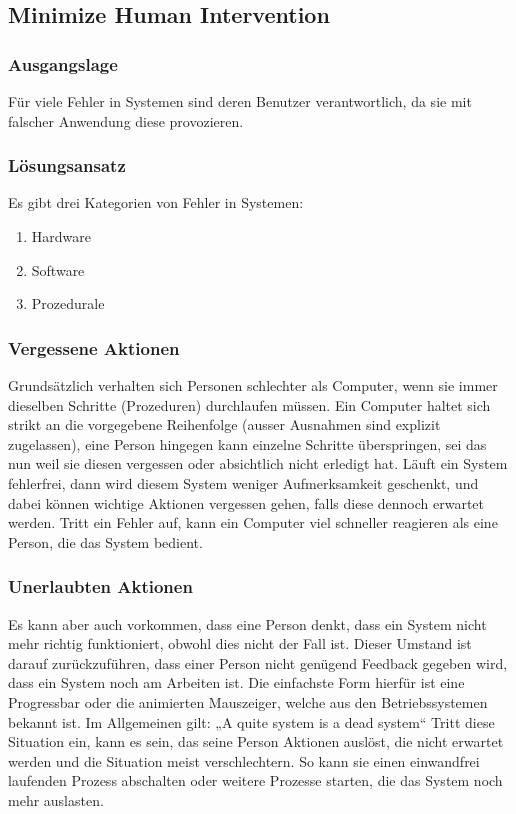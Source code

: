 
\subsection{Minimize Human Intervention}

\subsubsection*{Ausgangslage}

Für viele Fehler in Systemen sind deren Benutzer verantwortlich, da sie mit falscher Anwendung diese provozieren.
\subsubsection*{Lösungsansatz}

Es gibt drei Kategorien von Fehler in Systemen:
\begin{enumerate}
	\item Hardware
	\item Software
	\item Prozedurale
\end{enumerate}


\subsubsection*{Vergessene Aktionen}

Grundsätzlich verhalten sich Personen schlechter als Computer, wenn sie immer dieselben Schritte (Prozeduren) durchlaufen müssen. Ein Computer haltet sich strikt an die vorgegebene Reihenfolge (ausser Ausnahmen sind explizit zugelassen), eine Person hingegen kann einzelne Schritte überspringen, sei das nun weil sie diesen vergessen oder absichtlich nicht erledigt hat. Läuft ein System fehlerfrei, dann wird diesem System weniger Aufmerksamkeit geschenkt, und dabei können wichtige Aktionen vergessen gehen, falls diese dennoch erwartet werden.
Tritt ein Fehler auf, kann ein Computer viel schneller reagieren als eine Person, die das System bedient.

\subsubsection*{Unerlaubten Aktionen}

Es kann aber auch vorkommen, dass eine Person denkt, dass ein System nicht mehr richtig funktioniert, obwohl dies nicht der Fall ist. Dieser Umstand ist darauf zurückzuführen, dass einer Person nicht genügend Feedback gegeben wird, dass ein System noch am Arbeiten ist. Die einfachste Form hierfür ist eine Progressbar oder die animierten Mauszeiger, welche aus den Betriebssystemen bekannt ist.
Im Allgemeinen gilt: „A quite system is a dead system“
Tritt diese Situation ein, kann es sein, das seine Person Aktionen auslöst, die nicht erwartet werden und die Situation meist verschlechtern. So kann sie einen einwandfrei laufenden Prozess abschalten oder weitere Prozesse starten, die das System noch mehr auslasten.


